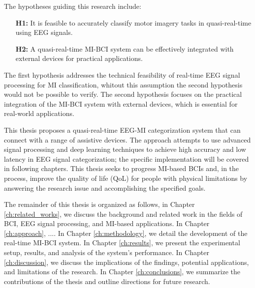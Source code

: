 The hypotheses guiding this research include:
\begin{itemize}
    \item[\textbf{H1:}] It is feasible to accurately classify motor imagery tasks in quasi-real-time using EEG signals.
    \item[\textbf{H2:}] A quasi-real-time MI-BCI system can be effectively integrated with external devices for practical applications.
\end{itemize}

The first hypothesis addresses the technical feasibility of real-time EEG signal processing for MI classification, whitout this assumption the second hypothesis would not be possible to verify.
The second hypothesis focuses on the practical integration of the MI-BCI system with external devices, which is essential for real-world applications.

This thesis proposes a quasi-real-time EEG-MI categorization system that can connect with a range of assistive devices.
The approach attempts to use advanced signal processing and deep learning techniques to achieve high accuracy and low latency in EEG signal categorization; the specific implementation will be covered in following chapters.
This thesis seeks to progress MI-based BCIs and, in the process, improve the quality of life (QoL) for people with physical limitations by answering the research issue and accomplishing the specified goals.


The remainder of this thesis is organized as follows, in Chapter \ref{ch:related_works}, we discuss the background and related work in the fields of BCI, EEG signal processing, and MI-based applications.
In Chapter \ref{ch:approach}, .... %
In Chapter \ref{ch:methodology}, we detail the development of the real-time MI-BCI system. %
In Chapter \ref{ch:results}, we present the experimental setup, results, and analysis of the system's performance.
In Chapter \ref{ch:discussion}, we discuss the implications of the findings, potential applications, and limitations of the research.
In Chapter \ref{ch:conclusions}, we summarize the contributions of the thesis and outline directions for future research.

